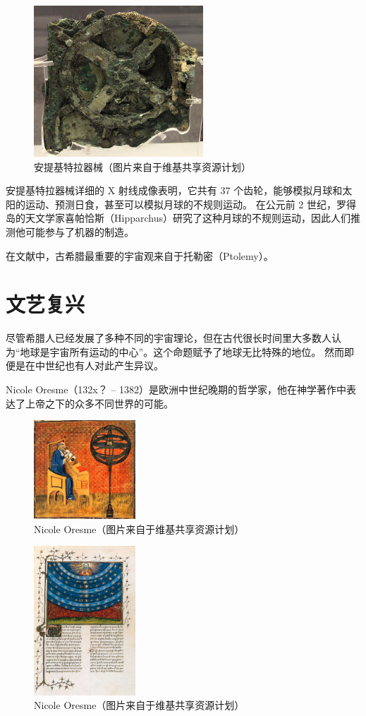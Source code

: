 \documentclass[a4paper,10.5pt]{book}
\begin{document}
\begin{figure}[ht]
\centering
\includegraphics[width=2.5in]{images/1_03-Antikythera.jpg}
\caption{安提基特拉器械（图片来自于维基共享资源计划）}
\end{figure}

安提基特拉器械详细的 X 射线成像表明，它共有 37 个齿轮，能够模拟月球和太阳的运动、预测日食，甚至可以模拟月球的不规则运动。
在公元前 2 世纪，罗得岛的天文学家喜帕恰斯（Hipparchus）研究了这种月球的不规则运动，因此人们推测他可能参与了机器的制造。

在文献中，古希腊最重要的宇宙观来自于托勒密（Ptolemy）。

\section{文艺复兴}

尽管希腊人已经发展了多种不同的宇宙理论，但在古代很长时间里大多数人认为“地球是宇宙所有运动的中心”。这个命题赋予了地球无比特殊的地位。
然而即便是在中世纪也有人对此产生异议。

Nicole Oresme（132x？ – 1382）是欧洲中世纪晚期的哲学家，他在神学著作中表达了上帝之下的众多不同世界的可能。

\begin{figure}[ht]
\centering
\includegraphics[width=1.5in]{images/1_02-Oresme.jpg}
\caption{Nicole Oresme（图片来自于维基共享资源计划）}
\end{figure}

\begin{figure}[ht]
\centering
\includegraphics[width=1.5in]{images/1_03-Oresme_Spheres.jpg}
\caption{Nicole Oresme（图片来自于维基共享资源计划）}
\end{figure}
\end{document}

